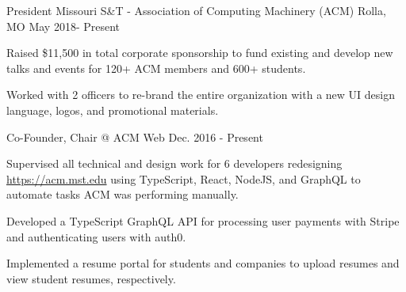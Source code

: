 \begin{cventries}

\cventry
  {President} %
  {Missouri S\&T - Association of Computing Machinery (ACM)} %
  {Rolla, MO} %
  {May 2018- Present} %
  {
    \begin{cvitems} %
      \item {Raised \$11,500 in total corporate sponsorship to fund existing and
             develop new talks and events for 120+ ACM members and 600+ students.}
      \item {Worked with 2 officers to re-brand the entire organization
             with a new UI design language, logos, and promotional materials.}
    \end{cvitems}
  }

\cventry
  {Co-Founder, Chair @ ACM Web} %
  {} %
  {} %
  {Dec. 2016 - Present} %
  {
    \begin{cvitems} %
      \item {Supervised all technical and design work for 6 developers
             redesigning \url{https://acm.mst.edu} using TypeScript, React,
             NodeJS, and GraphQL to automate tasks ACM was performing
             manually.}
      \item {Developed a TypeScript GraphQL API for processing user payments
             with Stripe and authenticating users with auth0.}
       \item {Implemented a resume portal for students and companies to upload resumes
              and view student resumes, respectively.}
    \end{cvitems}
  }




\end{cventries}
